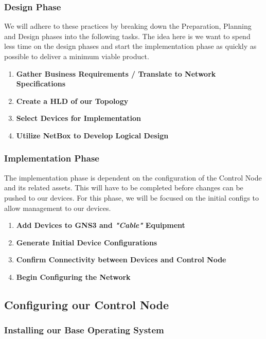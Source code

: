 \documentclass[12pt, letterpaper]{article}
\begin{document}
\subsubsection{Design Phase}

We will adhere to these practices by breaking down the Preparation, Planning and Design phases into the following tasks. The idea here is we want to spend less time on the design phases and start the implementation phase as quickly as possible to deliver a minimum viable product.

\begin{enumerate}
\item \textbf{Gather Business Requirements / Translate to Network Specifications}
\item \textbf{Create a HLD of our Topology}
\item \textbf{Select Devices for Implementation}
\item \textbf{Utilize NetBox to Develop Logical Design}
\end{enumerate}

\subsubsection{Implementation Phase}

The implementation phase is dependent on the configuration of the Control Node and its related assets. This will have to be completed before changes can be pushed to our devices. For this phase, we will be focused on the initial configs to allow management to our devices.

\begin{enumerate}
\item \textbf{Add Devices to GNS3 and \textit{"Cable"} Equipment}
\item \textbf{Generate Initial Device Configurations}
\item \textbf{Confirm Connectivity between Devices and Control Node}
\item \textbf{Begin Configuring the Network}
\end{enumerate}


\subsection{Configuring our Control Node}
	
	\subsubsection{Installing our Base Operating System}
	
\end{document}
